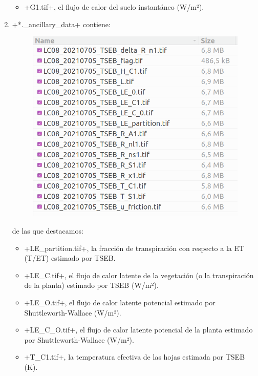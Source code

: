 \documentclass[a4paper,11pt]{article}
\begin{document}
\begin{enumerate}
\begin{itemize}
      \item \cverb+G1.tif+, el flujo de calor del suelo instantáneo (W/m²).
     \end{itemize}
     
     \item \cverb+*._ancillary_data+ contiene:
     
     \begin{figure}[H]\centering
      \includegraphics[width=\textwidth]{pytseb_ancdata_folder}
     \end{figure}
     
     de las que destacamos:
     \begin{itemize}
      \item \cverb+LE_partition.tif+, la fracción de transpiración con respecto a la ET (T/ET) estimado por TSEB.
      
      \item \cverb+LE_C.tif+, el flujo de calor latente de la vegetación (o la transpiración de la planta) estimado por TSEB (W/m²).
      
      \item \cverb+LE_O.tif+, el flujo de calor latente potencial estimado por Shuttleworth-Wallace (W/m²).
      
      \item \cverb+LE_C_O.tif+, el flujo de calor latente potencial de la planta estimado por Shuttleworth-Wallace (W/m²).
      
      \item \cverb+T_C1.tif+, la temperatura efectiva de las hojas estimada por TSEB (K).
      

\end{itemize}
\end{enumerate}
\end{document}

